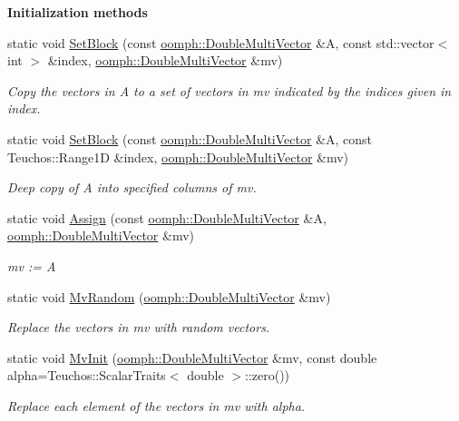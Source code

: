\begin{Indent}\textbf{ Initialization methods}\par
\begin{DoxyCompactItemize}
\item 
static void \hyperlink{classAnasazi_1_1MultiVecTraits_3_01double_00_01oomph_1_1DoubleMultiVector_01_4_ac52b7e1d688acef2afc3636e1cf7a58a}{Set\+Block} (const \hyperlink{classoomph_1_1DoubleMultiVector}{oomph\+::\+Double\+Multi\+Vector} \&A, const std\+::vector$<$ int $>$ \&index, \hyperlink{classoomph_1_1DoubleMultiVector}{oomph\+::\+Double\+Multi\+Vector} \&mv)
\begin{DoxyCompactList}\small\item\em Copy the vectors in {\ttfamily A} to a set of vectors in {\ttfamily mv} indicated by the indices given in {\ttfamily index}. \end{DoxyCompactList}\item 
static void \hyperlink{classAnasazi_1_1MultiVecTraits_3_01double_00_01oomph_1_1DoubleMultiVector_01_4_a72a2dfbb096511d602ef03d0ec29b50a}{Set\+Block} (const \hyperlink{classoomph_1_1DoubleMultiVector}{oomph\+::\+Double\+Multi\+Vector} \&A, const Teuchos\+::\+Range1D \&index, \hyperlink{classoomph_1_1DoubleMultiVector}{oomph\+::\+Double\+Multi\+Vector} \&mv)
\begin{DoxyCompactList}\small\item\em Deep copy of A into specified columns of mv. \end{DoxyCompactList}\item 
static void \hyperlink{classAnasazi_1_1MultiVecTraits_3_01double_00_01oomph_1_1DoubleMultiVector_01_4_af7888014d05b442a4d908974bba3d6c5}{Assign} (const \hyperlink{classoomph_1_1DoubleMultiVector}{oomph\+::\+Double\+Multi\+Vector} \&A, \hyperlink{classoomph_1_1DoubleMultiVector}{oomph\+::\+Double\+Multi\+Vector} \&mv)
\begin{DoxyCompactList}\small\item\em mv \+:= A \end{DoxyCompactList}\item 
static void \hyperlink{classAnasazi_1_1MultiVecTraits_3_01double_00_01oomph_1_1DoubleMultiVector_01_4_ad180ce9edf949c6e2b882b11cedeff8d}{Mv\+Random} (\hyperlink{classoomph_1_1DoubleMultiVector}{oomph\+::\+Double\+Multi\+Vector} \&mv)
\begin{DoxyCompactList}\small\item\em Replace the vectors in {\ttfamily mv} with random vectors. \end{DoxyCompactList}\item 
static void \hyperlink{classAnasazi_1_1MultiVecTraits_3_01double_00_01oomph_1_1DoubleMultiVector_01_4_af1301c3616281ebea692c28378dfead1}{Mv\+Init} (\hyperlink{classoomph_1_1DoubleMultiVector}{oomph\+::\+Double\+Multi\+Vector} \&mv, const double alpha=Teuchos\+::\+Scalar\+Traits$<$ double $>$\+::zero())
\begin{DoxyCompactList}\small\item\em Replace each element of the vectors in {\ttfamily mv} with {\ttfamily alpha}. \end{DoxyCompactList}\end{DoxyCompactItemize}
\end{Indent}
